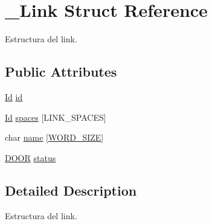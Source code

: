 \hypertarget{struct__Link}{\section{\+\_\+\+Link Struct Reference}
\label{struct__Link}
}


Estructura del link.  


\subsection*{Public Attributes}
\begin{DoxyCompactItemize}
\item 
\hyperlink{types_8h_a845e604fb28f7e3d97549da3448149d3}{Id} \hyperlink{struct__Link_a151212e7a8e8274c2a1ee991ba95878b}{id}
\item 
\hyperlink{types_8h_a845e604fb28f7e3d97549da3448149d3}{Id} \hyperlink{struct__Link_a05724c89a2945c364f76302d1bcd3196}{spaces} \mbox{[}L\+I\+N\+K\+\_\+\+S\+P\+A\+C\+E\+S\mbox{]}
\item 
char \hyperlink{struct__Link_a655f0a5d235d1fd6797299dd4763672b}{name} \mbox{[}\hyperlink{types_8h_a92ed8507d1cd2331ad09275c5c4c1c89}{W\+O\+R\+D\+\_\+\+S\+I\+Z\+E}\mbox{]}
\item 
\hyperlink{types_8h_a4eb959f56c9de4fb79f4891902033093}{D\+O\+O\+R} \hyperlink{struct__Link_a4d1168b16e3b3c297a6e7b096ff8b9f7}{status}
\end{DoxyCompactItemize}


\subsection{Detailed Description}
Estructura del link. 

